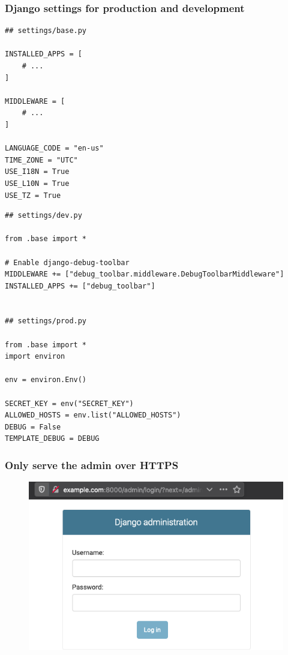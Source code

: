 \documentclass[aspectratio=169]{beamer}
\begin{document}
\begin{frame}[fragile]
\frametitle{Django settings for production and development}

\begin{multicols}{2}

{\tiny
\begin{verbatim}
## settings/base.py

INSTALLED_APPS = [
    # ...
]

MIDDLEWARE = [
    # ...
]

LANGUAGE_CODE = "en-us"
TIME_ZONE = "UTC"
USE_I18N = True
USE_L10N = True
USE_TZ = True
\end{verbatim}
}

\columnbreak

{\tiny
\begin{verbatim}
## settings/dev.py

from .base import *

# Enable django-debug-toolbar
MIDDLEWARE += ["debug_toolbar.middleware.DebugToolbarMiddleware"]
INSTALLED_APPS += ["debug_toolbar"]


## settings/prod.py

from .base import *
import environ

env = environ.Env()

SECRET_KEY = env("SECRET_KEY")
ALLOWED_HOSTS = env.list("ALLOWED_HOSTS")
DEBUG = False
TEMPLATE_DEBUG = DEBUG

\end{verbatim}
}

\end{multicols}

\end{frame}





\begin{frame}
\frametitle{Only serve the admin over HTTPS}
  \begin{figure}[p]
    \centering
    \includegraphics[width=0.6\paperwidth]{images/securing-admin-https.png}
  \end{figure}
\end{frame}
\end{document}
